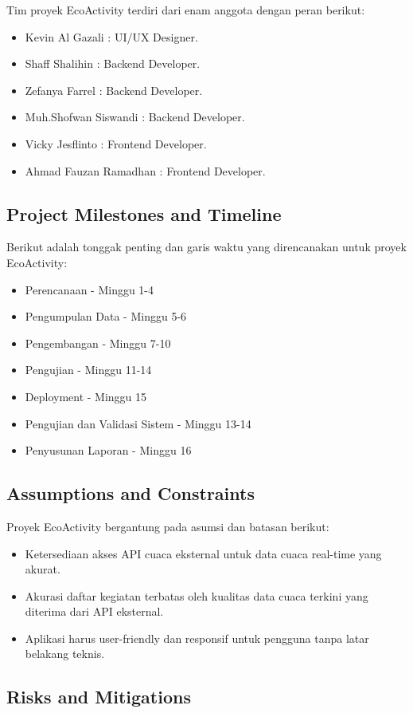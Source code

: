 \documentclass[journal,article,submit,pdftex,moreauthors]{Definitions/mdpi}
\begin{document}
Tim proyek EcoActivity terdiri dari enam anggota dengan peran berikut:
\begin{itemize}
    \item Kevin Al Gazali : UI/UX Designer.
    \item Shaff Shalihin : Backend Developer.
    \item Zefanya Farrel : Backend Developer.
    \item Muh.Shofwan Siswandi : Backend Developer.
    \item Vicky Jesflinto : Frontend Developer.
    \item Ahmad Fauzan Ramadhan : Frontend Developer.
\end{itemize}
\subsection{Project Milestones and Timeline}

Berikut adalah tonggak penting dan garis waktu yang direncanakan untuk proyek EcoActivity:
\begin{itemize}
    \item Perencanaan - Minggu 1-4
    \item Pengumpulan Data - Minggu 5-6
    \item Pengembangan - Minggu 7-10
    \item Pengujian - Minggu 11-14
    \item Deployment - Minggu 15
    \item Pengujian dan Validasi Sistem - Minggu 13-14
    \item Penyusunan Laporan - Minggu 16
\end{itemize}
\subsection{Assumptions and Constraints}

Proyek EcoActivity bergantung pada asumsi dan batasan berikut: \begin{itemize} 
\item Ketersediaan akses API cuaca eksternal untuk data cuaca real-time yang akurat. 
\item Akurasi daftar kegiatan terbatas oleh kualitas data cuaca terkini yang diterima dari API eksternal. \item Aplikasi harus user-friendly dan responsif untuk pengguna tanpa latar belakang teknis. 
\end{itemize}

\subsection{Risks and Mitigations}
\end{document}
